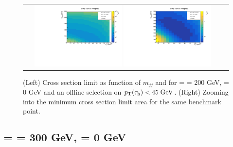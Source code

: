 \begin{figure}[tbh!]
	\centering
	\begin{tabular}{cc}
		\includegraphics[width=0.45\textwidth]{analysis/pics/JetInvMass_vs_MET_xsec_chi200_lsp000_taupt45.pdf}
		\includegraphics[width=0.45\textwidth]{analysis/pics/JetInvMass_vs_MET_xsec_chi200_lsp000_taupt45_zoom.pdf} 		
	\end{tabular}
	\caption{(Left) Cross section limit as function of $m_{jj}$ and \met for \charginopm = \neutralinotwo = 200 GeV, \neutralinoone = 0 GeV and an offline selection on $p_{\text{T}}(\tau_{\text{h}}) <  45\;\text{Ge}\kern-0.06667em\text{V}$. (Right) Zooming into the minimum cross section limit area for the same benchmark point.}
	\label{fig::JetInvMass_vs_MET_xsec_chi200_lsp000_taupt45}
\end{figure}

\FloatBarrier

\subsection*{\charginopm = \neutralinotwo = 300 GeV, \neutralinoone = 0 GeV}

\FloatBarrier

